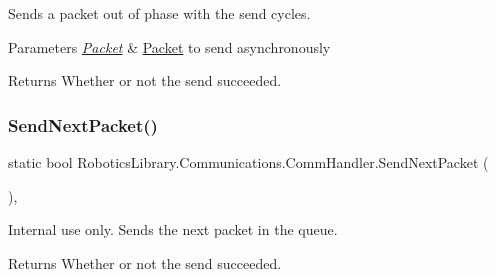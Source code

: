 Sends a packet out of phase with the send cycles. 


\begin{DoxyParams}{Parameters}
{\em \hyperlink{class_robotics_library_1_1_communications_1_1_packet}{Packet}} & \hyperlink{class_robotics_library_1_1_communications_1_1_packet}{Packet} to send asynchronously\\
\hline
\end{DoxyParams}
\begin{DoxyReturn}{Returns}
Whether or not the send succeeded. 
\end{DoxyReturn}
\mbox{\label{class_robotics_library_1_1_communications_1_1_comm_handler_a0f3233960b73b33e8a94adef22fb9e2f}} 
\subsubsection{\texorpdfstring{Send\+Next\+Packet()}{SendNextPacket()}}
{\footnotesize\ttfamily static bool Robotics\+Library.\+Communications.\+Comm\+Handler.\+Send\+Next\+Packet (\begin{DoxyParamCaption}{ }\end{DoxyParamCaption})\hspace{0.3cm}{\ttfamily [static]}, {\ttfamily [private]}}



Internal use only. Sends the next packet in the queue. 

\begin{DoxyReturn}{Returns}
Whether or not the send succeeded.
\end{DoxyReturn}
\mbox{\label{class_robotics_library_1_1_communications_1_1_comm_handler_a2c324044e0ecb019565eaa6d20fa0c27}} 
